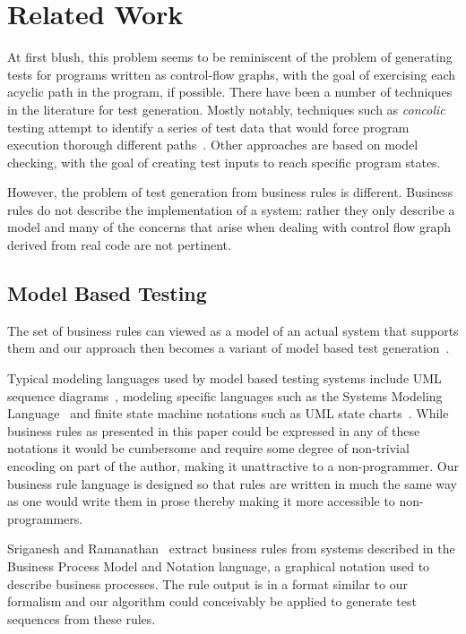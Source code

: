 \section{Related Work}

At first blush, this problem seems to be reminiscent of the problem of
generating tests for programs written as control-flow graphs, with the
goal of exercising each acyclic path in the program, if possible.
There have been a number of techniques in the literature for test
generation. Mostly notably, techniques such as \textit{concolic}
testing attempt to identify a series of test data that would force
program execution thorough different paths~\cite{dart, concolic}.  Other
approaches are based on model checking, with the goal of creating test
inputs to reach specific program states.

However, the problem of test generation from business rules is
different. Business rules do not describe the implementation of a
system: rather they only describe a model and many of the concerns
that arise when dealing with control flow graph derived from real code
are not pertinent.

\subsection{Model Based Testing}

The set of business rules can viewed as a model of an actual system
that supports them and our approach then becomes a variant of model
based test generation~\cite{utting2012}.

Typical modeling languages used by model based testing systems include
UML sequence diagrams~\cite{nayak2009}, modeling specific languages
such as the Systems Modeling Language~\cite{friedenthal2011} and
finite state machine notations such as UML
state charts~\cite{offhut99}. While business rules as presented in this
paper could be expressed in any of these notations it would be
cumbersome and require some degree of non-trivial encoding on part of
the author, making it unattractive to a non-programmer. Our business
rule language is designed so that rules are written in much the same
way as one would write them in prose thereby making it more accessible
to non-programmers.

Sriganesh and Ramanathan~\cite{sriganesh2012} extract business rules
from systems described in the Business Process Model and Notation
language, a graphical notation used to describe business
processes. The rule output is in a format similar to our formalism and
our algorithm could conceivably be applied to generate test sequences
from these rules.

